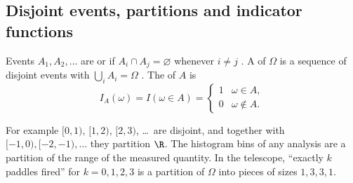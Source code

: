 \subsection{Disjoint events, partitions and indicator functions}

\begin{workdef}
Events $A_1,A_2,\dots$ are  or 
if $A_i\cap A_j=\varnothing$ whenever $i\neq j$ . A  of
$\Omega$ is a sequence of disjoint events with $\bigcup_i A_i=\Omega$
. The  of $A$ is
\[
I_A(\omega)=I(\omega\in A)=\begin{cases}1 & \omega\in A,\\ 0 & \omega\notin A.\end{cases}
\]
\end{workdef}

For example $[0,1)$, $[1,2)$, $[2,3)$, \dots\ are disjoint, and together with
$[-1,0),[-2,-1),\dots$ they partition $\R$. The histogram bins of any analysis
are a partition of the range of the measured quantity. In the telescope,
``exactly $k$ paddles fired'' for $k=0,1,2,3$ is a partition of $\Omega$ into
pieces of sizes $1,3,3,1$.

